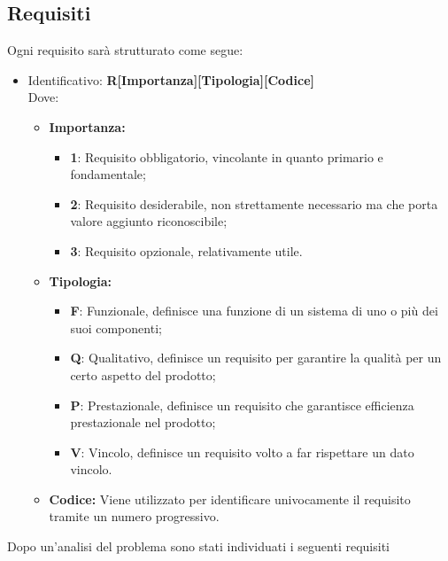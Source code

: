 \subsection{Requisiti}
Ogni requisito sarà strutturato come segue:
\begin{itemize}
	\item Identificativo: \textbf{R[Importanza][Tipologia][Codice]}\\
	Dove:
	\begin{itemize}
		\item \textbf{Importanza:}
		\begin{itemize}
			\item \textbf{1}: Requisito obbligatorio, vincolante in quanto primario e fondamentale;
			\item \textbf{2}: Requisito desiderabile, non strettamente necessario ma che porta valore aggiunto riconoscibile;
			\item \textbf{3}: Requisito opzionale, relativamente utile.
		\end{itemize}
		\item \textbf{Tipologia:}
		\begin{itemize}
			\item \textbf{F}: Funzionale, definisce una funzione di un sistema di uno o più dei suoi componenti;
			\item \textbf{Q}: Qualitativo, definisce un requisito per garantire la qualità per un certo aspetto del prodotto;
			\item \textbf{P}: Prestazionale, definisce un requisito che garantisce efficienza prestazionale nel prodotto;
			\item \textbf{V}: Vincolo, definisce un requisito volto a far rispettare un dato vincolo.
		\end{itemize}
		\item \textbf{Codice:} Viene utilizzato per identificare univocamente il requisito tramite un numero progressivo.\\
	\end{itemize}
\end{itemize}
Dopo un’analisi del problema sono stati individuati i seguenti requisiti
